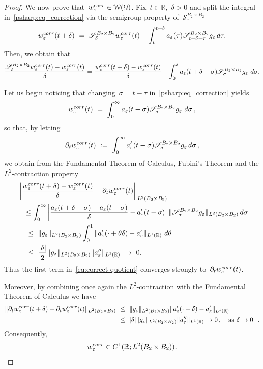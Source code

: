 \documentclass[leqno,10pt]{amsart}
\theoremstyle{plain}
\theoremstyle{remark}
\numberwithin{equation}{section}
\def \d{\,{\rm d}}
\def\er{\mathbb{R}}
\newcommand{\Wc}{\mathcal{W}}
\newcommand{\eps}{\varepsilon}
\def\Xint#1{\mathchoice
    {\XXint\displaystyle\textstyle{#1}}%
    {\XXint\textstyle\scriptstyle{#1}}%
    {\XXint\scriptstyle\scriptscriptstyle{#1}}%
    {\XXint\scriptscriptstyle\scriptscriptstyle{#1}}%
    \!\int}
\def\XXint#1#2#3{\setbox0=\hbox{$#1{#2#3}{\int}$}
    \vcenter{\hbox{$#2#3$}}\kern-0.5\wd0}
\def\bint{\Xint{-}}
\begin{document}
{\begin{proof}
We now prove that~$w_\eps^{\rm corr} \in \Wc(\mathcal{Q})$. 
Fix~$t\in\er$,~$\delta>0$ and split the integral in~\eqref{psharp:eq_correction} via the semigroup property of~$\mathscr{S}^{B_2\times B_2}_\tau$
\[
w_\eps^{\rm corr}(t+\delta)
\ = \ \mathscr{S}_{\delta}^{B_2\times B_2}w_\eps^{\rm corr}(t)
 +\int_t^{t+\delta}a_\eps(\tau)
 \mathscr{S}_{t+\delta-\tau}^{B_2\times B_2}g_\eps\d\tau.
\]
Then, we obtain that
\begin{equation}\label{eq:correct-quotient}
\frac{\mathscr{S}_{\delta}^{B_2\times B_2}w_\eps^{\rm corr}(t)
             -w_\eps^{\rm corr}(t)}\delta
=
 \frac{w_\eps^{\rm corr}(t+\delta)-w_\eps^{\rm corr}(t)}\delta
 -\bint_0^{\delta} a_\eps(t+\delta-\sigma)
 \mathscr{S}_{\sigma}^{B_2\times B_2}g_\eps\,\d \sigma.
\end{equation}

Let us begin noticing that changing~$\sigma=t-\tau$ in~\eqref{psharp:eq_correction} yields
\[
w_\eps^{\rm corr}(t)
\ =\ \int_0^\infty
 a_\eps(t-\sigma)\mathscr{S}_{\sigma}^{B_2\times B_2}g_\eps\,\d \sigma\,,
\]
so that, by letting
\[
\partial_tw_\eps^{\rm corr}(t)
\ :=\ \int_0^\infty
 a_\eps'(t-\sigma)\mathscr{S}_{\sigma}^{B_2\times B_2}g_\eps\d \sigma\,,
\]
we obtain from the Fundamental Theorem of Calculus, Fubini's Theorem and  the $L^2$-contraction property
\[
\begin{aligned}
&\left\|\frac{w_\eps^{\rm corr}(t+\delta)-w_\eps^{\rm corr}(t)}\delta-\partial_tw^{\rm corr}_\eps(t)\right\|_{L^2(B_2\times B_2)}\\
& \quad \leq \int_0^\infty \left| \frac{a_\eps(t+\delta-\sigma)-a_\eps(t-\sigma)}{\delta}-a_\eps'(t-\sigma)\right| \|\mathscr{S}_{\sigma}^{B_2\times B_2}g_\eps\|_{L^2(B_2\times B_2)}\d\sigma\\
& \quad\ \leq\ \|g_\eps\|_{L^2(B_2\times B_2)}\int_0^1
 \|a_\eps'(\cdot+\theta \delta)-a_\eps'\|_{L^1(\er)}\,\d\theta\\
& \quad\ \leq\ \frac{|\delta|}{2}\|g_\eps\|_{L^2(B_2\times B_2)}
 \|a_\eps''\|_{L^1(\er)}\ \to\ 0.
\end{aligned}
\]
Thus the first term in~\eqref{eq:correct-quotient} converges strongly to~$\partial_tw_\eps^{\rm corr}(t)$. 

Moreover, by combining once again the $L^2$-contraction with the Fundamental Theorem of Calculus we have
\[
\begin{aligned}
\|\partial_tw_\eps^{\rm corr}(t+\delta)-\partial_tw_\eps^{\rm corr}(t)\|_{L^2(B_2\times B_2)}
&\ \leq\ \|g_\eps\|_{L^2(B_2\times B_2)}
 \|a_\eps'(\cdot+\delta)-a_\eps'\|_{L^1(\er)}\\
&\ \leq\ |\delta|\|g_\eps\|_{L^2(B_2\times B_2)}\|a_\eps''\|_{L^1(\er)} \to 0\,, \quad \text{as}~\delta\to 0^+.
\end{aligned}
\]
Consequently,
\begin{equation}\label{eq:time-reg-corrector}
w_\eps^{\rm corr}\in C^1(\er;L^2(B_2\times B_2)).
\end{equation}


\end{proof}}
\end{document}
